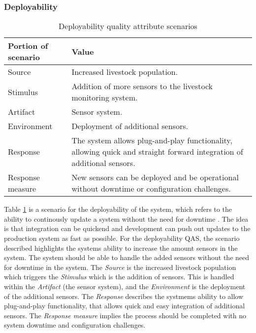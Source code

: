 \subsubsection{Deployability}

\begin{table}[h]
    \renewcommand{\arraystretch}{1.3}
    \caption{Deployability quality attribute scenarios}
    \label{deployability}
    \centering
    \begin{tabularx}{\columnwidth}{>{\hsize=0.3\hsize}X>{\hsize=0.7\hsize}X}
        \hline
        \textbf{Portion of scenario} & \textbf{Value}                                                                                                        \\
        \hline
        Source                       & Increased livestock population.                                                                                       \\
        Stimulus                     & Addition of more sensors to the livestock monitoring system.                                                          \\
        Artifact                     & Sensor system.                                                                                                        \\
        Environment                  & Deployment of additional sensors.                                                                                     \\
        Response                     & The system allows plug-and-play functionality, allowing quick and straight forward integration of additional sensors. \\
        Response measure             & New sensors can be deployed and be operational without downtime or configuration challenges.                          \\
        \hline
    \end{tabularx}
\end{table}


Table \ref{deployability} is a scenario for the deployability of the system, which refers to the ability to continously update a system without the need for downtime \cite{bass2021software}. The idea is that integration can be quickend and development can push out updates to the production system as fast as possible.
For the deployability QAS, the scenario described highlights the systems ability to increase the amount sensors in the system. The system should be able to handle the added sensors without the need for downtime in the system.
The \textit{Source} is the increased livestock population which triggers the \textit{Stimulus} which is the addition of sensors. This is handled within the \textit{Artifact} (the sensor system), and the \textit{Environment} is the deployment of the additional sensors.
The \textit{Response} describes the systmems ability to allow plug-and-play functionality, that allows quick and easy integration of additional sensors. The \textit{Response measure} implies the process should be completed with no system downtime and configuration challenges. \newline